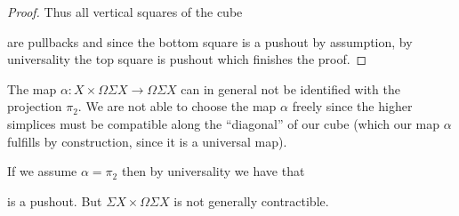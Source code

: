 \begin{lemma}
\begin{proof}
        Thus all vertical squares of the cube
        \begin{center}
        \end{center}
        are pullbacks and since the bottom square is a pushout by assumption, by universality the top square is pushout which finishes the proof.
    \end{proof}
\end{lemma}
\begin{remark}\label{rmk:mapNotProj}
    The map $\alpha\colon X\times\Omega\Sigma X\to\Omega\Sigma X$ can in general not be identified with the projection $\pi_2$.
    We are not able to choose the map $\alpha$ freely since the higher simplices must be compatible along the ``diagonal'' of our cube (which our map $\alpha$ fulfills by construction, since it is a universal map).

    If we assume $\alpha=\pi_2$ then by universality we have that 
    \begin{center}
    \end{center}
    is a pushout.
    But $\Sigma X \times \Omega\Sigma X$ is not generally contractible. 
\end{remark}
